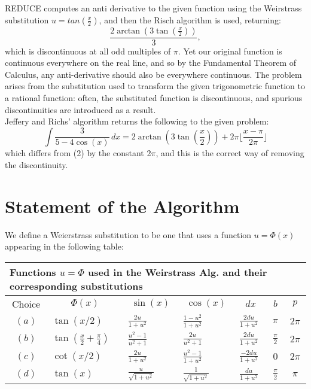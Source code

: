 \small{REDUCE} \normalsize computes an anti derivative to the given function using the Weirstrass substitution $u=tan(\frac{x}{2})$, and then the Risch algorithm is used, returning: 
    \begin{equation} \frac{2\arctan(3\tan(\frac{x}{2}))}{3}, \end{equation}
which is discontinuous at all odd multiples of $\pi$. Yet our original function is continuous everywhere on the real line, and so by the Fundamental Theorem of Calculus, any anti-derivative should also be everywhere continuous. The problem arises from the substitution used to transform the given trigonometric function to a rational function: often, the substituted function is discontinuous, and spurious discontinuities are introduced as a result. \\
Jeffery and Richs' algorithm returns the following to the given problem: \\
\[ \int \frac{3}{5-4\cos(x)}\,dx = 2\arctan(3\tan(\frac{x}{2}))+2\pi\lfloor \frac{x-\pi}{2\pi} \rfloor \]
which differs from (2) by the constant 2$\pi$, and this is the correct way of removing the discontinuity.
\pagebreak 
\section{Statement of the Algorithm}
We define a Weierstrass substitution to be one that uses a function $u=\Phi(x)$ appearing in the following table: \\

\begin{tabular}{|c|p{1in}|p{0.5in}|p{0.5in}|p{0.5in}|c|c||} \hline 
\multicolumn{7}{|l|}{Functions $u=\Phi$ used in the Weirstrass Alg. and their corresponding substitutions} \\ \hline
\multicolumn{1}{|c|}{Choice} 
&\multicolumn{1}{|c|}{  $\Phi(x)$  } 
&\multicolumn{1}{|c|}{  $\sin(x)$  } 
&\multicolumn{1}{|c|}{  $\cos(x)$  } 
&\multicolumn{1}{|c|}{  $dx$  } 
&\multicolumn{1}{|c|}{  $b$  } 
&\multicolumn{1}{|c|}{  $p$  }  \\  \hline
$(a)$  & $\tan(x/2)$ & $\frac{2u}{1+u^{2}}$ & $ \frac{1-u^{2}}{1+u^{2}}$ & $\frac{2du}{1+u^{2}}$ & $\pi$ & $2\pi$ \\ \hline
$(b)$  & $\tan(\frac{x}{2}+\frac{\pi}{4})$ & $\frac{u^{2}-1}{u^{2}+1}$ & $\frac{2u}{u^{2}+1} $ & $\frac{2du}{1+u^{2}}$ & $\frac{\pi}{2}$ & $2\pi$ \\ \hline
$(c)$ & $\cot(x/2)$ & $\frac{2u}{1+u^{2}}$ & $\frac{u^{2}-1}{1+u^{2}}$ & $\frac{-2du}{1+u^{2}}$ & $0$ & $2\pi$ \\ \hline
$(d)$ & $\tan(x)$ & $\frac{u}{\sqrt{1+u^{2}}}$ & $\frac{1}{\sqrt{1+u^{2}}}$ & $\frac{du}{1+u^{2}}$ & $\frac{\pi}{2}$ & $\pi$ \\ \hline         
\end{tabular} \vspace{4mm}


